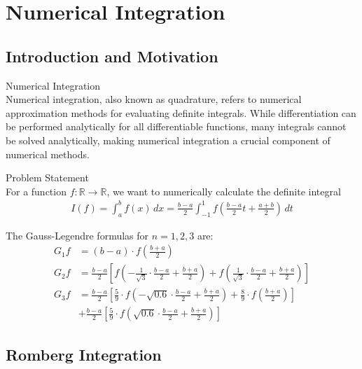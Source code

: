 

\section{Numerical Integration}

\subsection{Introduction and Motivation}

\begin{definition}{Numerical Integration}\\
Numerical integration, also known as quadrature, refers to numerical approximation methods for evaluating definite integrals. While differentiation can be performed analytically for all differentiable functions, many integrals cannot be solved analytically, making numerical integration a crucial component of numerical methods.
\end{definition}

\begin{concept}{Problem Statement}\\
For a function $f: \mathbb{R} \rightarrow \mathbb{R}$, we want to numerically calculate the definite integral
\begin{align*}
I(f) = \int_a^b f(x) \, dx = \frac{b-a}{2}\int_{-1}^{1} f\left(\frac{b-a}{2}t + \frac{a+b}{2}\right) \, dt
\end{align*}

The Gauss-Legendre formulas for $n=1, 2, 3$ are:
\begin{align*}
G_1f &= (b-a) \cdot f\left(\frac{b+a}{2}\right)\\
G_2f &= \frac{b-a}{2}\left[f\left(-\frac{1}{\sqrt{3}}\cdot\frac{b-a}{2} + \frac{b+a}{2}\right) + f\left(\frac{1}{\sqrt{3}}\cdot\frac{b-a}{2} + \frac{b+a}{2}\right)\right]\\
G_3f &= \frac{b-a}{2}\left[\frac{5}{9}\cdot f\left(-\sqrt{0.6}\cdot\frac{b-a}{2} + \frac{b+a}{2}\right) + \frac{8}{9}\cdot f\left(\frac{b+a}{2}\right)\right]\\
&+ \frac{b-a}{2}\left[\frac{5}{9}\cdot f\left(\sqrt{0.6}\cdot\frac{b-a}{2} + \frac{b+a}{2}\right)\right]
\end{align*}
\end{concept}

\subsection{Romberg Integration}

